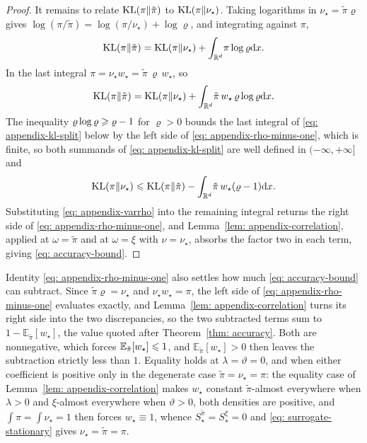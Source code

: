 \documentclass{article}
\begin{document}
\begin{proof}
It remains to relate $\mathrm{KL}(\pi\|\tilde\pi)$ to $\mathrm{KL}(\pi\|\nu_\star)$. Taking logarithms in $\nu_\star=\tilde\pi\varrho$ gives $\log(\pi/\tilde\pi) = \log(\pi/\nu_\star) + \log\varrho$, and integrating against $\pi$,
\begin{equation*}
	\mathrm{KL}(\pi\|\tilde\pi) = \mathrm{KL}(\pi\|\nu_\star) + \int_{\mathbb R^d}\!\pi\log\varrho\mathrm{d} x .
\end{equation*}
In the last integral $\pi = \nu_\star w_\star = \tilde\pi\,\varrho\,w_\star$, so
\begin{equation}
    \mathrm{KL}(\pi\|\tilde\pi) = \mathrm{KL}(\pi\|\nu_\star) + \int_{\mathbb R^d}\!\tilde\pi\,w_\star\,\varrho\log\varrho\mathrm{d} x .
    \label{eq: appendix-kl-split}
\end{equation}
The inequality $\varrho\log\varrho\geqslant\varrho-1$ for $\varrho>0$ bounds the last integral of \eqref{eq: appendix-kl-split} below by the left side of \eqref{eq: appendix-rho-minus-one}, which is finite, so both summands of \eqref{eq: appendix-kl-split} are well defined in $(-\infty,+\infty]$ and
\begin{equation*}
    \mathrm{KL}(\pi\|\nu_\star) \leqslant \mathrm{KL}(\pi\|\tilde\pi) - \int_{\mathbb R^d}\!\tilde\pi\,w_\star(\varrho-1)\mathrm{d} x.
\end{equation*}
Substituting \eqref{eq: appendix-varrho} into the remaining integral returns the right side of \eqref{eq: appendix-rho-minus-one}, and Lemma~\ref{lem: appendix-correlation}, applied at $\omega=\tilde\pi$ and at $\omega=\xi$ with $\nu=\nu_\star$, absorbs the factor two in each term, giving \eqref{eq: accuracy-bound}.
\end{proof}

Identity \eqref{eq: appendix-rho-minus-one} also settles how much \eqref{eq: accuracy-bound} can subtract. Since $\tilde\pi\varrho=\nu_\star$ and $\nu_\star w_\star=\pi$, the left side of \eqref{eq: appendix-rho-minus-one} evaluates exactly, and Lemma~\ref{lem: appendix-correlation} turns its right side into the two discrepancies, so {\color{blue}the two subtracted terms} sum to $1-\mathbb E_{\tilde\pi}[w_\star]$, the value quoted after Theorem~\ref{thm: accuracy}. Both are nonnegative, which forces $\mathbb E_{\tilde\pi}[w_\star]\leqslant1$, and $\mathbb E_{\tilde\pi}[w_\star]>0$ then leaves the subtraction strictly less than $1$. Equality holds at $\lambda=\vartheta=0$, and when either coefficient is positive only in the degenerate case $\tilde\pi=\nu_\star=\pi$: the equality case of Lemma~\ref{lem: appendix-correlation} makes $w_\star$ constant $\tilde\pi$-almost everywhere when $\lambda>0$ and $\xi$-almost everywhere when $\vartheta>0$, both densities are positive, and $\int\pi=\int\nu_\star=1$ then forces $w_\star\equiv1$, whence $S^{\tilde\pi}_\star=S^{\xi}_\star=0$ and \eqref{eq: surrogate-stationary} gives $\nu_\star=\tilde\pi=\pi$.
\end{document}
